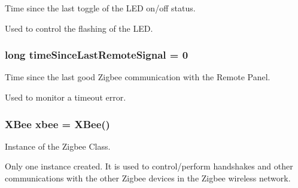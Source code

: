 Time since the last toggle of the L\+ED on/off status. 

Used to control the flashing of the L\+ED. 
\subsubsection[{\texorpdfstring{time\+Since\+Last\+Remote\+Signal}{timeSinceLastRemoteSignal}}]{\setlength{\rightskip}{0pt plus 5cm}long time\+Since\+Last\+Remote\+Signal = 0}\hypertarget{masterPanel_8ino_a3840f059f2cf5d2544a8eb65120ecc31}{}\label{masterPanel_8ino_a3840f059f2cf5d2544a8eb65120ecc31}


Time since the last good Zigbee communication with the Remote Panel. 

Used to monitor a timeout error. 
\subsubsection[{\texorpdfstring{xbee}{xbee}}]{\setlength{\rightskip}{0pt plus 5cm}X\+Bee xbee = X\+Bee()}\hypertarget{masterPanel_8ino_a18bbd7dece9ef587254b08710426fd17}{}\label{masterPanel_8ino_a18bbd7dece9ef587254b08710426fd17}


Instance of the Zigbee Class. 

Only one instance created. It is used to control/perform handshakes and other communications with the other Zigbee devices in the Zigbee wireless network. 